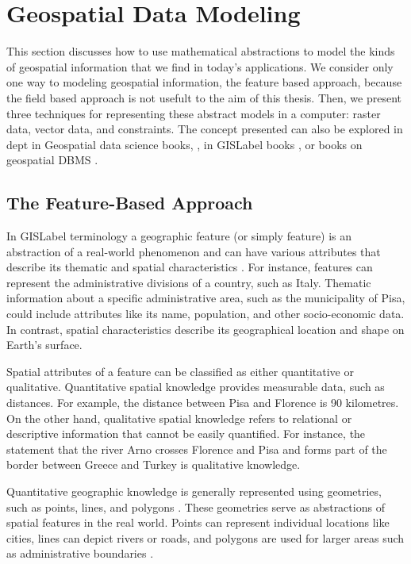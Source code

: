 \section{Geospatial Data Modeling}\label{II-sec:geospatialDataModeling}

This section discusses how to use mathematical abstractions to model the kinds of geospatial
information that we find in today’s applications. We consider only one way to modeling geospatial information, the feature based approach, because the field based approach is not usefult to the aim of this thesis. Then, we present three techniques for representing these abstract models in a computer: raster data, vector data, and constraints. The concept presented can also be explored in dept in Geospatial data science books, \cite{koubarakisGeospatialDataScience2023}, in \acrfull{GISLabel} books \cite{longleyGeographicInformationScience2015}, or books on geospatial DBMS \cite{rigauxSpatialDatabasesApplication2001, reveszIntroductionDatabasesBiological2010}.

\subsection{The Feature-Based Approach}\label{II-subsec:featureBased}


In \acrshort{GISLabel} terminology a geographic feature (or simply feature) is an abstraction of a real-world phenomenon and can have various attributes that describe its thematic and spatial characteristics \cite{longleyGeographicInformationScience2015}. For instance, features can represent the administrative divisions of a country, such as Italy. Thematic information about a specific administrative area, such as the municipality of Pisa, could include attributes like its name, population, and other socio-economic data. In contrast, spatial characteristics describe its geographical location and shape on Earth's surface.

Spatial attributes of a feature can be classified as either quantitative or qualitative. Quantitative spatial knowledge provides measurable data, such as distances. For example, the distance between Pisa and Florence is 90 kilometres. On the other hand, qualitative spatial knowledge refers to relational or descriptive information that cannot be easily quantified. For instance, the statement that the river Arno crosses Florence and Pisa and forms part of the border between Greece and Turkey is qualitative knowledge.

Quantitative geographic knowledge is generally represented using geometries, such as points, lines, and polygons \cite{rigauxSpatialDatabasesApplication2001, reveszIntroductionDatabasesBiological2010}. These geometries serve as abstractions of spatial features in the real world. Points can represent individual locations like cities, lines can depict rivers or roads, and polygons are used for larger areas such as administrative boundaries .

